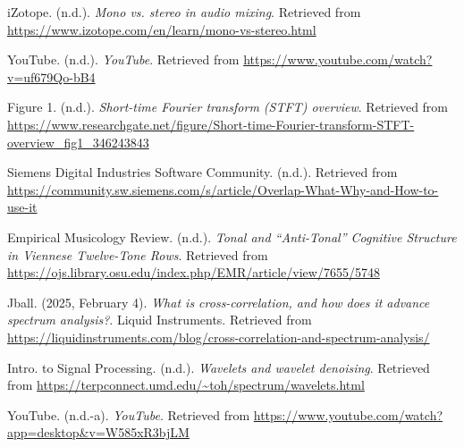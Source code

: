 \documentclass{article}
\begin{document}
\newpage
\begin{thebibliography}{9}

iZotope. (n.d.). \textit{Mono vs. stereo in audio mixing}. Retrieved from \url{https://www.izotope.com/en/learn/mono-vs-stereo.html}

YouTube. (n.d.). \textit{YouTube}. Retrieved from \url{https://www.youtube.com/watch?v=uf679Qo-bB4}

Figure 1. (n.d.). \textit{Short-time Fourier transform (STFT) overview}. Retrieved from \url{https://www.researchgate.net/figure/Short-time-Fourier-transform-STFT-overview_fig1_346243843}

Siemens Digital Industries Software Community. (n.d.). Retrieved from \url{https://community.sw.siemens.com/s/article/Overlap-What-Why-and-How-to-use-it}

Empirical Musicology Review. (n.d.). \textit{Tonal and “Anti-Tonal” Cognitive Structure in Viennese Twelve-Tone Rows}. Retrieved from \url{https://ojs.library.osu.edu/index.php/EMR/article/view/7655/5748}

Jball. (2025, February 4). \textit{What is cross-correlation, and how does it advance spectrum analysis?}. Liquid Instruments. Retrieved from \url{https://liquidinstruments.com/blog/cross-correlation-and-spectrum-analysis/}

Intro. to Signal Processing. (n.d.). \textit{Wavelets and wavelet denoising}. Retrieved from \url{https://terpconnect.umd.edu/~toh/spectrum/wavelets.html}

YouTube. (n.d.-a). \textit{YouTube}. Retrieved from \url{https://www.youtube.com/watch?app=desktop&v=W585xR3bjLM}

\end{thebibliography}
\end{document}
